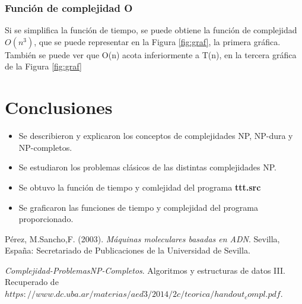 \documentclass[11pt]{article}
\begin{document}
\newpage
\subsubsection{Función de complejidad O}

Si se simplifica la función de tiempo, se puede obtiene la función de complejidad $O(n^3)$, que se puede representar en la Figura \ref{fig:graf}, la primera gráfica.
También se puede ver que O(n) acota inferiormente a T(n), en la tercera gráfica de la Figura \ref{fig:graf}




\newpage
 
\newpage
\section{Conclusiones}
\begin{itemize}
\item Se describieron y explicaron los conceptos de complejidades NP, NP-dura y NP-completos.
\item Se estudiaron los problemas clásicos de las distintas complejidades NP.
\item Se obtuvo la función de tiempo y comlejidad del programa \textbf{ttt.src}
\item Se graficaron las funciones de tiempo y complejidad del programa proporcionado.
\end{itemize}

\begin{thebibliography}{15}

Pérez, M.Sancho,F. (2003). \textit{Máquinas moleculares basadas en ADN}. Sevilla, España: Secretariado de Publicaciones de la Universidad de Sevilla. 

 \textit{Complejidad-ProblemasNP-Completos}. Algoritmos y estructuras de datos III. Recuperado de $https://www.dc.uba.ar/materias/aed3/2014/2c/teorica/handout_compl.pdf$. 

\end{thebibliography}
\end{document}
